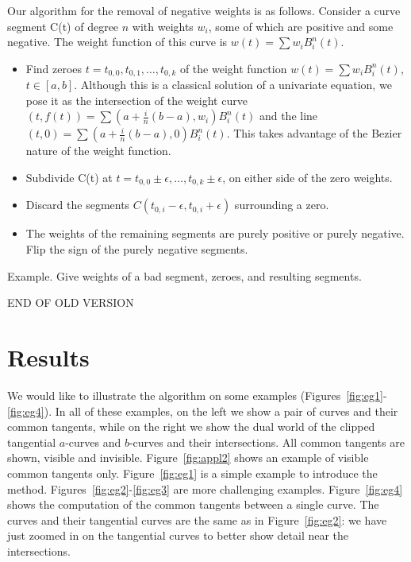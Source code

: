 \documentclass[9pt,twocolumn]{article}
\begin{document}
{Our algorithm for the removal of negative weights is as follows.
Consider a curve segment C(t) of degree $n$ with weights $w_i$,
some of which are positive and some negative.
The weight function of this curve is $w(t) = \sum w_i B_i^n(t)$.
%
\begin{itemize}
\item Find zeroes $t = t_{0,0},t_{0,1},\ldots,t_{0,k}$ of the weight function
	$w(t) = \sum w_i B_i^n(t)$, $t \in [a,b]$.
	Although this is a classical solution of a univariate equation,
	we pose it as the intersection of the weight curve 
	$(t,f(t)) = \sum (a + \frac{i}{n} (b-a), w_i) B_i^n(t)$
	and the line $(t,0) = \sum (a + \frac{i}{n} (b-a), 0)B_i^n(t)$.
	This takes advantage of the Bezier nature of the weight function.
%
\item Subdivide C(t) at $t = t_{0,0} \pm \epsilon,\ldots,t_{0,k} \pm \epsilon$,
	on either side of the zero weights.
\item Discard the segments $C(t_{0,i}-\epsilon,t_{0,i}+\epsilon)$
	surrounding a zero.
\item The weights of the remaining segments are purely positive or
	purely negative.  Flip the sign of the purely negative segments.
\end{itemize}

\begin{example}
Example.
Give weights of a bad segment, zeroes, and resulting segments.
\end{example}
END OF OLD VERSION
}

\section{Results}
\label{sec:results}

We would like to illustrate the algorithm on some examples 
(Figures~\ref{fig:eg1}-\ref{fig:eg4}).
In all of these examples, on the left we show a pair of curves 
and their common tangents,
while on the right we show the dual world of 
the clipped tangential $a$-curves and $b$-curves and their intersections.
All common tangents are shown, visible and invisible.
Figure~\ref{fig:appl2} shows an example of visible common tangents only.
Figure~\ref{fig:eg1} is a simple example to introduce the method.
Figures~\ref{fig:eg2}-\ref{fig:eg3} are more challenging examples.
Figure~\ref{fig:eg4} shows the computation of the common tangents
between a single curve.
The curves and their tangential curves are the same as in Figure~\ref{fig:eg2}:
we have just zoomed in on the tangential curves to better show detail
near the intersections.
\end{document}
